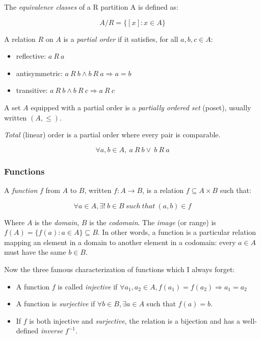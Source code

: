 \documentclass{article}
\begin{document}
The \emph{equivalence classes} of a R partition A is defined as:

\[A / R = \{[x]: x\in A\}\]

A relation \(R\) on \(A\) is a \emph{partial order} if it satisfies, for
all \(a, b, c\in
A\):

\begin{itemize}
\tightlist
\item
  reflective: \(a\ R\ a\)
\item
  antisymmetric: \(a\ R\ b \land b\ R\ a \Rightarrow a = b\)
\item
  transitive: \(a\ R\ b \land b\ R\ c \Rightarrow a\ R\ c\)
\end{itemize}

A set \(A\) equipped with a partial order is a \emph{partially ordered
set} (poset), usually written \((A, \le )\).

\emph{Total} (linear) order is a partial order where every pair is
comparable.

\[\forall a, b\in A,\ a\ R\ b \lor \ b\ R\ a\]

\subsubsection{Functions}\label{functions}

A \emph{function} \(f\) from \(A\) to \(B\), written
\(f: A\rightarrow B\), is a relation \(f\subseteq A\times B\) such that:

\[\forall a\in A, \exists !\ b\in B\ such\ that\ (a, b)\in f\]

Where \(A\) is the \emph{domain}, \(B\) is the \emph{codomain}. The
\emph{image} (or range) is \(f(A) = \{f(a): a\in A\} \subseteq B\). In
other words, a function is a particular relation mapping an element in a
domain to another element in a codomain: every \(a\in A\) must have the
same \(b\in B\).

Now the three famous characterization of functions which I always
forget:

\begin{itemize}
\tightlist
\item
  A function \(f\) is called \emph{injective} if
  \(\forall a_1, a_2 \in A, f(a_1) =
  f(a_2) \Rightarrow a_1 = a_2\)
\item
  A function is \emph{surjective} if \(\forall b \in B, \exists a\in A\)
  such that \(f(a)=b\).
\item
  If \(f\) is both injective and \emph{surjective}, the relation is a
  bijection and has a well-defined \emph{inverse} \(f^{-1}\).
\end{itemize}
\end{document}
